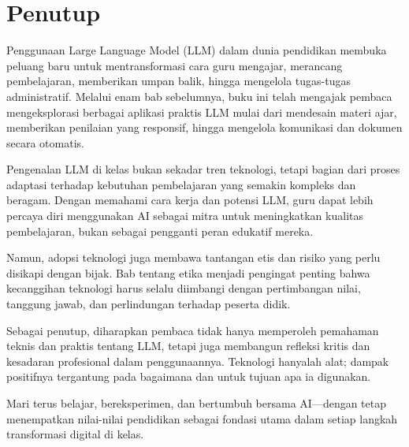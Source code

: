 \chapter{Penutup}

Penggunaan Large Language Model (LLM) dalam dunia pendidikan membuka peluang baru untuk mentransformasi cara guru mengajar, merancang pembelajaran, memberikan umpan balik, hingga mengelola tugas-tugas administratif. Melalui enam bab sebelumnya, buku ini telah mengajak pembaca mengeksplorasi berbagai aplikasi praktis LLM mulai dari mendesain materi ajar, memberikan penilaian yang responsif, hingga mengelola komunikasi dan dokumen secara otomatis.

Pengenalan LLM di kelas bukan sekadar tren teknologi, tetapi bagian dari proses adaptasi terhadap kebutuhan pembelajaran yang semakin kompleks dan beragam. Dengan memahami cara kerja dan potensi LLM, guru dapat lebih percaya diri menggunakan AI sebagai mitra untuk meningkatkan kualitas pembelajaran, bukan sebagai pengganti peran edukatif mereka.

Namun, adopsi teknologi juga membawa tantangan etis dan risiko yang perlu disikapi dengan bijak. Bab tentang etika menjadi pengingat penting bahwa kecanggihan teknologi harus selalu diimbangi dengan pertimbangan nilai, tanggung jawab, dan perlindungan terhadap peserta didik.

Sebagai penutup, diharapkan pembaca tidak hanya memperoleh pemahaman teknis dan praktis tentang LLM, tetapi juga membangun refleksi kritis dan kesadaran profesional dalam penggunaannya. Teknologi hanyalah alat; dampak positifnya tergantung pada bagaimana dan untuk tujuan apa ia digunakan.

Mari terus belajar, bereksperimen, dan bertumbuh bersama AI—dengan tetap menempatkan nilai-nilai pendidikan sebagai fondasi utama dalam setiap langkah transformasi digital di kelas.


